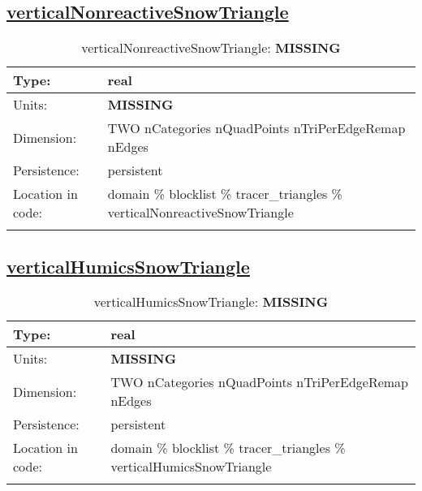 \subsection[verticalNonreactiveSnowTriangle]{\hyperref[sec:var_tab_tracer_triangles]{verticalNonreactiveSnowTriangle}}
\label{subsec:var_sec_tracer_triangles_verticalNonreactiveSnowTriangle}
\begin{center}
\begin{longtable}{| p{2.0in} | p{4.0in} |}
        \hline 
        Type: & real \\
        \hline 
        Units: & {\bf \color{red} MISSING} \\
        \hline 
        Dimension: & TWO nCategories nQuadPoints nTriPerEdgeRemap nEdges \\
        \hline 
        Persistence: & persistent \\
        \hline 
         Location in code: & domain \% blocklist \% tracer\_triangles \% verticalNonreactiveSnowTriangle \\
         \hline 
    \caption{verticalNonreactiveSnowTriangle: {\bf \color{red} MISSING}}
\end{longtable}
\end{center}
\subsection[verticalHumicsSnowTriangle]{\hyperref[sec:var_tab_tracer_triangles]{verticalHumicsSnowTriangle}}
\label{subsec:var_sec_tracer_triangles_verticalHumicsSnowTriangle}
\begin{center}
\begin{longtable}{| p{2.0in} | p{4.0in} |}
        \hline 
        Type: & real \\
        \hline 
        Units: & {\bf \color{red} MISSING} \\
        \hline 
        Dimension: & TWO nCategories nQuadPoints nTriPerEdgeRemap nEdges \\
        \hline 
        Persistence: & persistent \\
        \hline 
         Location in code: & domain \% blocklist \% tracer\_triangles \% verticalHumicsSnowTriangle \\
         \hline 
    \caption{verticalHumicsSnowTriangle: {\bf \color{red} MISSING}}
\end{longtable}
\end{center}

